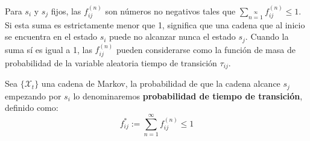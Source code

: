 Para $s_i$ y $s_j$ fijos, las $f_{ij}^{(n)}$ son números no negativos tales que $\sum\limits_{n=1}\limits^\infty f_{ij}^{(n)}\leq1$. Si esta suma es estrictamente menor que 1, significa que una cadena que al inicio se encuentra en el estado $s_i$ puede no alcanzar nunca el estado $s_j$. Cuando la suma sí es igual a 1, las $f_{ij}^{(n)}$ pueden considerarse como la función de masa de probabilidad de la variable aleatoria tiempo de transición $\tau_{ij}$.

\begin{definition}
    Sea $\{\mathcal{X}_t\}$ una cadena de Markov, la probabilidad de que la cadena alcance $s_j$ empezando por $s_i$ lo denominaremos \textbf{probabilidad de tiempo de transición}, definido como:
    \[f_{ij}^*:=\sum_{n=1}^\infty f_{ij}^{(n)}\leq1\]
\end{definition}

